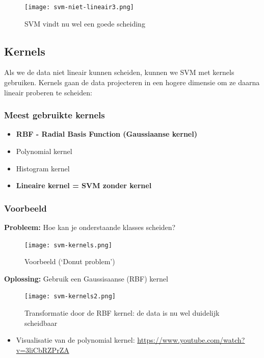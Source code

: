 \documentclass{article}
\begin{document}
\begin{figure}[H]
    \centering
    \texttt{[image: svm-niet-lineair3.png]}
    \caption{SVM vindt nu wel een goede scheiding}
\end{figure}

\subsection{Kernels}

Als we de data niet lineair kunnen scheiden, kunnen we SVM met kernels gebruiken.
Kernels gaan de data projecteren in een hogere dimensie om ze daarna lineair proberen te scheiden:

\subsubsection{Meest gebruikte kernels}

\begin{itemize}
    \item \textbf{RBF - Radial Basis Function (Gaussiaanse kernel)}
    \item Polynomial kernel
    \item Histogram kernel
    \item \textbf{Lineaire kernel = SVM zonder kernel}
\end{itemize}

\subsubsection{Voorbeeld}

\textbf{Probleem:} Hoe kan je onderstaande klasses scheiden?

\begin{figure}[H]
    \centering
    \texttt{[image: svm-kernels.png]}
    \caption{Voorbeeld (`Donut problem')}
\end{figure}

\textbf{Oplossing:} Gebruik een Gaussisaanse (RBF) kernel

\begin{figure}[H]
    \centering
    \texttt{[image: svm-kernels2.png]}
    \caption{Transformatie door de RBF kernel: de data is nu wel duidelijk scheidbaar}
\end{figure}

\begin{itemize}
    \item Visualisatie van de polynomial kernel: \url{https://www.youtube.com/watch?v=3liCbRZPrZA}
\end{itemize}
\end{document}
